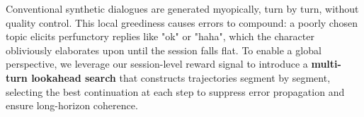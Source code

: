 Conventional synthetic dialogues are generated myopically, turn by turn, without quality control. This local greediness causes errors to compound: a poorly chosen topic elicits perfunctory replies like "ok" or "haha", which the character obliviously elaborates upon until the session falls flat. To enable a global perspective, we leverage our session-level reward signal to introduce a \textbf{multi-turn lookahead search} that constructs trajectories segment by segment, selecting the best continuation at each step to suppress error propagation and ensure long-horizon coherence.








